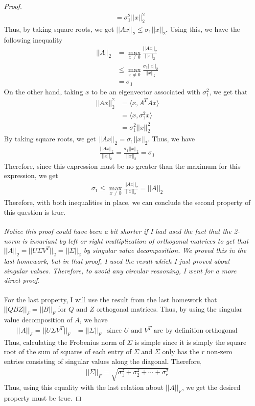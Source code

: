 \documentclass[10pt,a4paper]{article}
\theoremstyle{definition}
\theoremstyle{definition}
\numberwithin{equation}{section}
\begin{document}
\begin{proof}
\begin{align*}
&= \sigma_1^2 ||x||_2^2
\end{align*}
Thus, by taking square roots, we get $||Ax||_2 \leq \sigma_1 ||x||_2$. Using this, we have the following inequality
\begin{align*}
||A||_2 &= \max_{x \neq 0} \frac{||Ax||_2}{||x||_2}\\
&\leq \max_{x \neq 0} \frac{\sigma_1||x||_2}{||x||_2}\\
&= \sigma_1
\end{align*}
On the other hand, taking $x$ to be an eigenvector associated with $\sigma_1^2$, we get that 
\begin{align*}
||Ax||_2^2 &= \langle x, A^T Ax \rangle\\
&= \langle x, \sigma_1^2 x \rangle\\
&= \sigma_1^2 ||x||_2^2
\end{align*}
By taking square roots, we get $||Ax||_2 = \sigma_1 ||x||_2$. Thus, we have
\begin{align*}
\frac{||Ax||_2}{||x||_2} = \frac{\sigma_1 ||x||_2}{||x||_2} = \sigma_1
\end{align*}
Therefore, since this expression must be no greater than the maximum for this expression, we get
\begin{align*}
\sigma_1 \leq \max_{x \neq 0} \frac{||Ax||_2}{||x||_2} = ||A||_2
\end{align*}
Therefore, with both inequalities in place, we can conclude the second property of this question is true. \\
\\\emph{Notice this proof could have been a bit shorter if I had used the fact that the 2-norm is invariant by left or right multiplication of orthogonal matrices to get that $||A||_2 = ||U\Sigma V^T||_2 = ||\Sigma||_2$ by singular value decomposition. We proved this in the last homework, but in that proof, I used the result which I just proved about singular values. Therefore, to avoid any circular reasoning, I went for a more direct proof.}
\\
\\For the last property, I will use the result from the last homework that $||QBZ||_F = ||B||_F$ for $Q$ and $Z$ orthogonal matrices. Thus, by using the singular value decomposition of $A$, we have
\begin{align*}
||A||_F = ||U\Sigma V^T||_F &= ||\Sigma||_F &\text{since $U$ and $V^T$ are by definition orthogonal}
\end{align*}
Thus, calculating the Frobenius norm of $\Sigma$ is simple since it is simply the square root of the sum of squares of each entry of $\Sigma$ and $\Sigma$ only has the $r$ non-zero entries consisting of singular values along the diagonal. Therefore,
\begin{align*}
||\Sigma||_F = \sqrt{\sigma_1^2 + \sigma_2^2 + \cdots + \sigma_r^2}
\end{align*}
Thus, using this equality with the last relation about $||A||_F$, we get the desired property must be true. 
\end{proof}
\end{document}
